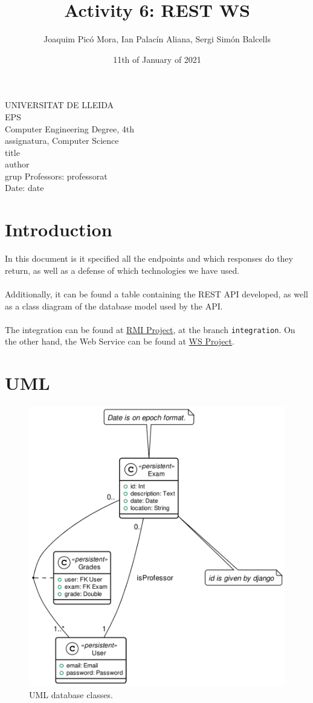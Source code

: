 \documentclass[11pt]{article}
\title{Activity 6: REST WS}
\author{Joaquim Picó Mora, Ian Palacín Aliana, Sergi Simón Balcells}
\date{11th of January of 2021}
\renewcommand{\maketitle}{ %
	\begin{titlepage}
		\raggedright{UNIVERSITAT DE LLEIDA \\
			EPS \\
			Computer Engineering Degree, 4th\\
			\1assignatura, Computer Science\\}
		\vspace{5cm}
		\centering
		\huge{\5title \\}
		\vspace{3cm}
		\large{\6author} \\
		\normalsize{\3grup}
		\vfill
		Professors: \4professorat \\
		Date: \7date
\end{titlepage}}
\begin{document}
	\maketitle
\thispagestyle{empty}
\newpage
{}
\tableofcontents
\newpage
{}


\section{Introduction}
\label{sec:orgde35f88}
In this document is it specified all the endpoints and which responses
do they return, as well as a defense of which technologies we have used.
\\
\\
Additionally, it can be found a table containing the REST API developed,
as well as a class diagram of the database model used by the API.
\\
\\
The integration can be found at \href{https://github.com/sergisi/java-rmi/tree/integration}{RMI Project}, at
the branch \texttt{integration}. On the other hand, the Web Service can be found at
\href{https://github.com/quimpm/ws-distcomp}{WS Project}.

\section{UML}
\begin{figure}[h!]
	
	\begin{center}
		\includegraphics[width=.9\linewidth]{img/message_passing.png}
	\end{center}
	\caption{UML database classes.}
	\label{sec:org11252ab}
\end{figure}
\end{document}
